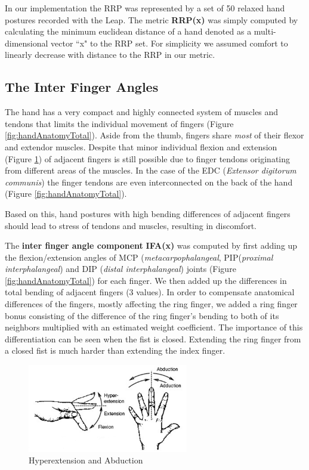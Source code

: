 \documentclass[headsepline,footsepline,footinclude=false,oneside,fontsize=11pt,paper=a4,listof=totoc,bibliography=totoc]{scrbook} %
\begin{document}
In our implementation the RRP was represented by a set of 50 relaxed hand postures recorded with the Leap. The metric \textbf{RRP(x)} was simply computed by calculating the minimum euclidean distance of a hand denoted as a multi-dimensional vector ``x" to the RRP set.
For simplicity we assumed comfort to linearly decrease with distance to the RRP in our metric.

\subsection{The Inter Finger Angles}

The hand has a very compact and highly connected system of muscles and tendons that limits the individual movement of fingers (Figure \ref{fig:handAnatomyTotal}).
Aside from the thumb, fingers share \textsl{most} of their flexor and extendor muscles. Despite that minor individual flexion and extension (Figure \ref{fig:hyperabduction}) of adjacent fingers is still possible due to finger tendons originating from different areas of the muscles. In the case of the EDC (\textit{Extensor digitorum communis}) the finger tendons are even interconnected on the back of the hand (Figure \ref{fig:handAnatomyTotal}). 

Based on this, hand postures with high bending differences of adjacent fingers should lead to stress of tendons and muscles, resulting in discomfort.

The \textbf{inter finger angle component} \textbf{IFA(x)} was computed by first adding up the flexion/extension angles of MCP (\textit{metacarpophalangeal}, PIP(\textit{proximal interphalangeal}) and DIP (\textit{distal interphalangeal}) joints (Figure \ref{fig:handAnatomyTotal}) for each finger. We then added up the differences in total bending of adjacent fingers (3 values). In order to compensate anatomical differences of the fingers, mostly affecting the ring finger, we added a ring finger bonus consisting of the difference of the ring finger's bending to both of its neighbors multiplied with an estimated weight coefficient. The importance of this differentiation can be seen when the fist is closed. Extending the ring finger from a closed fist is much harder than extending the index finger. 

\begin{figure}[b]
\centering
\vspace{-10pt}
\includegraphics[width=7cm]{abduction}
\vspace{-10pt}
\caption{Hyperextension and Abduction}
\label{fig:hyperabduction}
\vspace{-10pt}
\end{figure}
\end{document}
